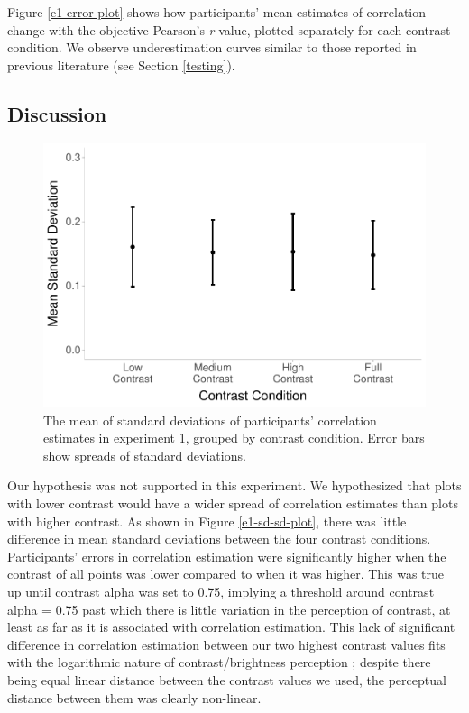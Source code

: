 \documentclass[preprint, 3p,
authoryear]{elsarticle} %
\begin{document}
Figure \ref{e1-error-plot} shows how participants' mean estimates of
correlation change with the objective Pearson's \emph{r} value, plotted
separately for each contrast condition. We observe underestimation
curves similar to those reported in previous literature (see Section
\ref{testing}).

\hypertarget{discussion}{%
\subsection{Discussion}\label{discussion}}

\begin{figure}

\includegraphics[width=0.5\linewidth]{contrast_and_scatterplots_files/figure-latex/e1-sd-sd-plot-1} \hfill{}

\caption{\label{e1-sd-sd-plot}The mean of standard deviations of participants' correlation estimates in experiment 1, grouped by contrast condition. Error bars show spreads of standard deviations.}\label{fig:e1-sd-sd-plot}
\end{figure}

Our hypothesis was not supported in this experiment. We hypothesized
that plots with lower contrast would have a wider spread of correlation
estimates than plots with higher contrast. As shown in Figure
\ref{e1-sd-sd-plot}, there was little difference in mean standard
deviations between the four contrast conditions. Participants' errors in
correlation estimation were significantly higher when the contrast of
all points was lower compared to when it was higher. This was true up
until contrast alpha was set to 0.75, implying a threshold around
contrast alpha = 0.75 past which there is little variation in the
perception of contrast, at least as far as it is associated with
correlation estimation. This lack of significant difference in
correlation estimation between our two highest contrast values fits with
the logarithmic nature of contrast/brightness perception
\citep{varshney_2013, fechner_1948}; despite there being equal linear
distance between the contrast values we used, the perceptual distance
between them was clearly non-linear.
\end{document}
